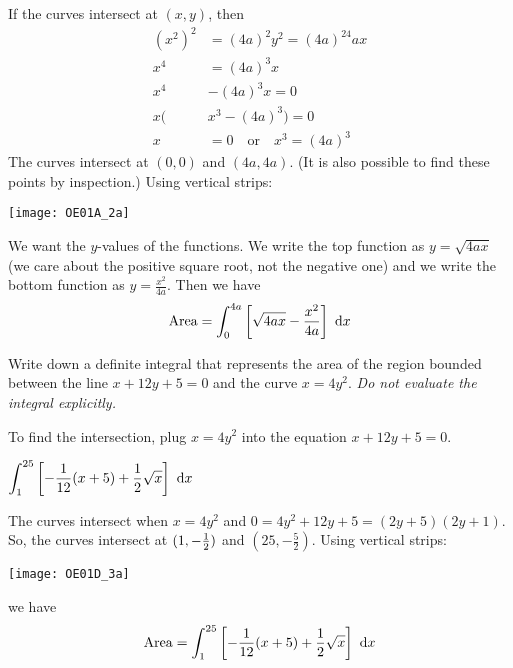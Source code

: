\begin{solution}
If the curves intersect at $(x,y)$, then
\begin{align*}
\left(x^2\right)^2&=\left(4a\right)^2y^2 = (4a)^24ax\\
x^4&=(4a)^3 x\\
x^4&-(4a)^3x=0\\
x(&x^3-(4a)^3)=0\\
x&= 0 \quad\mbox{or}\quad x^3=(4a)^3
\end{align*}
The curves intersect at $(0,0)$ and $(4a,4a)$. (It is also possible to find these points by inspection.) Using vertical strips:
\begin{center}
       \texttt{[image: OE01A\_2a]}
\end{center}
We want the $y$-values of the functions. We write the top  function as $y =\sqrt{4ax}$ (we care about the positive square root, not the negative one) and we write the bottom function as $y=\frac{x^2}{4a}$.
Then we have
\begin{align*}
\text{Area} = \int_0^{4a}\left[\sqrt{4ax}-\frac{x^2}{4a}\right]\ \mathrm{d}x
\end{align*}

\end{solution}

\begin{Mquestion}[2001D]
Write down a definite integral that represents the
area of the region bounded between the line $x+12y+5=0$
and the curve  $x=4y^2$.
\emph{Do not evaluate the integral explicitly.}
\end{Mquestion}

\begin{hint}
To find the intersection, plug $x=4y^2$ into the equation $x+12y+5=0$.
\end{hint}

\begin{answer}
$\displaystyle\int_1^{25}\left[-\frac{1}{12}(x+5)+\frac{1}{2}\sqrt{x}\right]\ \dee{x}$
\end{answer}

\begin{solution}
The curves intersect when $x=4y^2$ and $0=4y^2+12y+5
=(2y+5)(2y+1)$. So, the curves intersect at $(1,-\tfrac{1}{2})$ and $(25,-\frac{5}{2})$.
Using vertical strips:
\begin{center}
       \texttt{[image: OE01D\_3a]}
\end{center}
we have
\begin{align*}
\text{Area} =
\int_1^{25}\left[-\frac{1}{12}(x+5)+\frac{1}{2}\sqrt{x}\right]\ \mathrm{d}x
\end{align*}

\end{solution}



